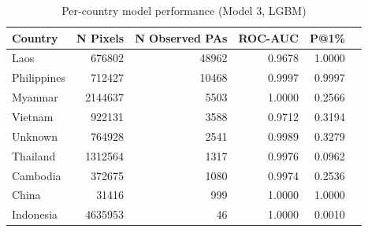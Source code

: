 \begin{table}[h]
\centering
\begin{tabular}{lrrrrr}
\toprule
Country & N Pixels & N Observed PAs & ROC-AUC & P@1\% \\
\midrule
Laos & 676802 & 48962 & 0.9678 & 1.0000 \\
Philippines & 712427 & 10468 & 0.9997 & 0.9997 \\
Myanmar & 2144637 & 5503 & 1.0000 & 0.2566 \\
Vietnam & 922131 & 3588 & 0.9712 & 0.3194 \\
Unknown & 764928 & 2541 & 0.9989 & 0.3279 \\
Thailand & 1312564 & 1317 & 0.9976 & 0.0962 \\
Cambodia & 372675 & 1080 & 0.9974 & 0.2536 \\
China & 31416 & 999 & 1.0000 & 1.0000 \\
Indonesia & 4635953 & 46 & 1.0000 & 0.0010 \\
\bottomrule
\end{tabular}
\caption{Per-country model performance (Model 3, LGBM)}
\label{tab:country_breakdown_lgbm}
\end{table}
